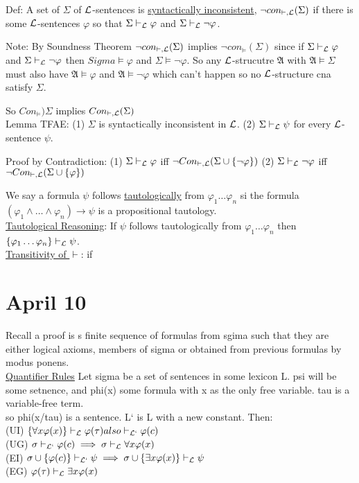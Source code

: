 \documentclass[11pt]{amsart}
\begin{document}
    Def: A set of $\Sigma$ of $\mathcal{L}$-sentences is \underline{syntactically inconsistent}, $\neg con_{\vdash, \mathcal{L}}(\Sigma)$
    if there is some $\mathcal{L}$-sentences $\varphi$ so that $\Sigma \vdash_{\mathcal{L}} \varphi$ and $\Sigma \vdash_{\mathcal{L}} \neg \varphi$.

    Note: By Soundness Theorem $\neg con_{\vdash, \mathcal{L}}(\Sigma)$ implies $\neg con_{\models}(\Sigma)$ since if $\Sigma \vdash_{\mathcal{L}} \varphi$ and $\Sigma \vdash_{\mathcal{L}} \neg \varphi$ then $Sigma \models \varphi$ and $\Sigma \models \neg \varphi$.
    So any $\mathcal{L}$-strucutre $\mathfrak{A}$ with $\mathfrak{A} \models \Sigma$ must also have $\mathfrak{A} \models \varphi$ and $\mathfrak{A} \models \neg \varphi$ which can't happen so no $\mathcal{L}$-structure cna satisfy $\Sigma$.

    So $Con_{\models})\Sigma$ implies $Con_{\vdash,\mathcal{L}}(\Sigma)$\\
    Lemma TFAE:
    (1) $\Sigma$ is syntactically inconsistent in $\mathcal{L}$.
    (2) $\Sigma \vdash_{\mathcal{L}} \psi$ for every $\mathcal{L}$-sentence $\psi$.

    Proof by Contradiction:
    (1) $\Sigma \vdash_{\mathcal{L}} \varphi$ iff $\neg Con_{\vdash, \mathcal{L}}(\Sigma \cup \{\neg \varphi\})$
    (2) $\Sigma \vdash_{\mathcal{L}} \neg \varphi$ iff $ \neg Con_{\vdash, \mathcal{L}}(\Sigma \cup \{\varphi\})$

    We say a formula $\psi$ follows \underline{tautologically} from $\varphi_1 \dots \varphi_n$ si the formula $(\varphi_1 \wedge \dots \wedge \varphi_n) \rightarrow \psi$ is a propositional tautology.
    \\ \underline{Tautological Reasoning}: If $\psi$ follows tautologically from $\varphi_1 \dots \varphi_n$ then $\{\varphi_1 \dots \varphi_n\} \vdash_{\mathcal{L}} \psi$.
    \\ \underline{Transitivity of $\vdash$}: if


    \section{April 10}
    Recall a proof is s finite sequence of formulas from sgima such that they are either logical axioms, members of sigma or obtained from previous formulas by modus ponens.
    \\
    \underline{Quantifier Rules}
    Let sigma be a set of sentences in some lexicon L.
    psi will be some setnence, and phi(x) some formula with x as the only free variable.
    tau is a variable-free term.
    \\
    so phi(x/tau) is a sentence.
    L` is L with a new constant.
    Then:\\
    (UI) $\{\forall x \varphi(x)\} \vdash_{\mathcal{L}} \varphi(\tau) also \vdash_{\mathcal{L}`} \varphi(c)$ \\
    (UG) $\sigma \vdash_{\mathcal{L}`} \varphi(c) \implies \sigma \vdash_{\mathcal{L}} \forall x \varphi(x)$ \\
    (EI) $\sigma \cup \{\varphi(c)\} \vdash_{\mathcal{L}`} \psi \implies \sigma \cup \{\exists x \varphi(x)\} \vdash_{\mathcal{L}} \psi$\\
    (EG) $\varphi(\tau) \vdash_{\mathcal{L}} \exists x \varphi(x)$
\end{document}
